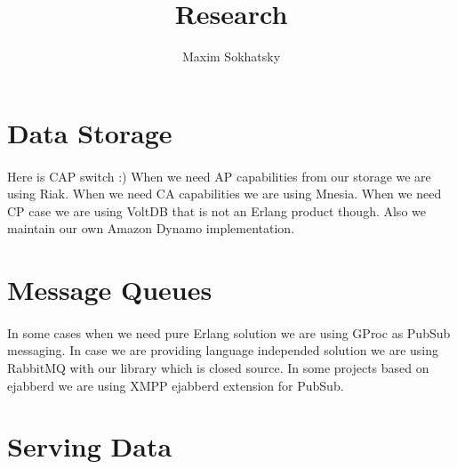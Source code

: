 \documentclass[11pt]{article}
\begin{document}

\title{Research}
\author{Maxim Sokhatsky}

\section*{Data Storage}
\paragraph{}
    Here is CAP switch :) When we need AP capabilities from our storage we are using Riak.
    When we need CA capabilities we are using Mnesia.
    When we need CP case we are using VoltDB that is not an Erlang product though. 
    Also we maintain our own Amazon Dynamo implementation.
\section*{Message Queues}
\paragraph{}
    In some cases when we need pure Erlang solution we are using GProc as PubSub messaging.
    In case we are providing language independed solution we are using RabbitMQ with our library which is closed source. 
    In some projects based on ejabberd we are using XMPP ejabberd extension for PubSub.
\section*{Serving Data}
\end{document}

